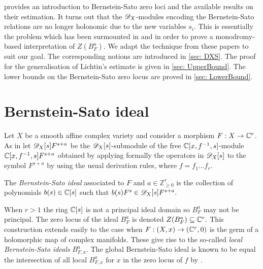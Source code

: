  provides an introduction to Bernstein-Sato zero loci and the available results on their estimation.
It turns out that the $\mathscr{D}_X$-modules encoding the Bernstein-Sato relations are no longer holonomic due to the new variables $s_i$.
This is essentially the problem which has been surmounted in \cite{budur2020zeroI} and \cite{budur2020zeroII} in order to prove a monodromy-based interpretation of $Z(B_F^a)$.
We adapt the technique from these papers to suit our goal.
The corresponding notions are introduced in \cref{sec: DXS}.
The proof for the generalisation of Lichtin's estimate is given in \cref{sec: UpperBound}.
The lower bounds on the Bernstein-Sato zero locus are proved in \cref{sec: LowerBound}.


\section{Bernstein-Sato ideal}\label{sec: BSIdeal}
Let $X$ be a smooth affine complex variety and consider a morphism $F:X\to \mathbb{C}^r$.
As in  let $\mathscr{D}_X[s]F^{s+a}$ be the $\mathscr{D}_X[s]$-submodule of the free $\mathbb{C}[x,f^{-1},s]$-module $\mathbb{C}[x,f^{-1},s]F^{s+a}$ obtained by applying formally the operators in $\mathscr{D}_X[s]$ to the symbol $F^{s+a}$ by using the usual derivation rules, where $f=f_1\ldots f_r$.
\begin{definition}
  The {\it Bernstein-Sato ideal} associated to $F$ and $a\in \mathbb{Z}_{\geq 0}^r$ is the collection of polynomials $b(s)\in \mathbb{C}[s]$ such that $b(s)F^s \in  \mathscr{D}_X[s]F^{s+a}.$
\end{definition}
When $r>1$ the ring $\mathbb{C}[s]$ is not a principal ideal domain so $B_F^{a}$ may not be principal.
The zero locus of the ideal $B_F^a$ is denoted $Z(B_F^a)\subseteq \mathbb{C}^r.$
This construction extends easily to the case when $F:(X,x)\to (\mathbb{C}^r,0)$ is the germ of a holomorphic map of complex manifolds.
These give rise to the so-called {\it local Bernstein-Sato ideals} $B_{F,x}^a$.
The global Bernstein-Sato ideal is known to be equal the intersection of all local $B_{F,x}^a$ for $x$ in the zero locus of $f$ by \cite{brianccon2002remarques}.

